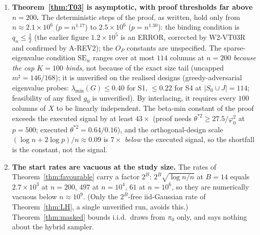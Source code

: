 \documentclass[11pt]{article}
\theoremstyle{definition}
\theoremstyle{remark}
\newcommand{\Sz}{S_0}
\begin{document}
\begin{enumerate}
\item[3.] \textbf{Theorem~\ref{thm:T03} is asymptotic, with proof thresholds far above $n=200$.}
The deterministic steps of the proof, as written, hold only from $n\approx2.1\times10^6$ ($p=n^{1.17}$) to $2.5\times10^6$ ($p=n^{1.30}$): the binding condition is $q_n\le\tfrac12$ (the earlier figure $1.2\times10^5$ is an ERROR, corrected by W2-VT03R and confirmed by A-REV2); the $O_P$ constants are unspecified. The sparse-eigenvalue condition $\mathrm{SE}_w$ ranges over at most $114$ columns at $n=200$ \emph{because the cap $K=100$ binds}, not because of the exact size tail (uncapped $m^\sharp=146/168$); it is unverified on the realised designs (greedy-adversarial eigenvalue probes: $\lambda_{\min}(G)\le0.40$ for S1, $\le0.22$ for S4 at $|\Sz\cup J|=114$; feasibility of any fixed $g_0$ is unverified). By interlacing, it requires every $100$ columns of $X$ to be linearly independent. The beta-min constant of the proof exceeds the executed signal by at least $43\times$ (proof needs $\theta^{*2}\ge27.5/\varphi_0^2$ at $p=500$; executed $\theta^{*2}=0.64/0.16$), and the orthogonal-design scale $(\log n+2\log p)/n\approx0.09$ is $7\times$ \emph{below} the executed signal, so the shortfall is the constant, not the signal.

\item[4.] \textbf{The start rates are vacuous at the study size.}
The rates of Theorem~\ref{thm:favourable} carry a factor $2^B$: $2^B\sqrt{\log n/n}$ at $B=14$ equals $2.7\times10^3$ at $n=200$, $497$ at $n=10^4$, $61$ at $n=10^6$, so they are numerically vacuous below $n\approx10^9$. (Only the $2^B$-free iid-Gaussian rate of Theorem~\ref{thm:LH}, a single unverified run, avoids this.) Theorem~\ref{thm:masked} bounds i.i.d.\ draws from $\pi_0$ only, and says nothing about the hybrid sampler.


\end{enumerate}
\end{document}

